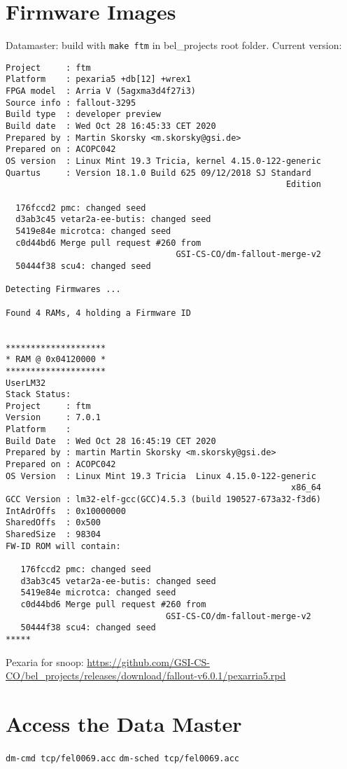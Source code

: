 \documentclass[12pt,a4paper]{report}
\begin{document}
\section{Firmware Images}
Datamaster: build with \texttt{make ftm} in bel\_projects root folder. Current version:
\begin{verbatim}
Project     : ftm
Platform    : pexaria5 +db[12] +wrex1
FPGA model  : Arria V (5agxma3d4f27i3)
Source info : fallout-3295
Build type  : developer preview
Build date  : Wed Oct 28 16:45:33 CET 2020
Prepared by : Martin Skorsky <m.skorsky@gsi.de>
Prepared on : ACOPC042
OS version  : Linux Mint 19.3 Tricia, kernel 4.15.0-122-generic
Quartus     : Version 18.1.0 Build 625 09/12/2018 SJ Standard
                                                        Edition

  176fccd2 pmc: changed seed
  d3ab3c45 vetar2a-ee-butis: changed seed
  5419e84e microtca: changed seed
  c0d44bd6 Merge pull request #260 from
                                  GSI-CS-CO/dm-fallout-merge-v2
  50444f38 scu4: changed seed

Detecting Firmwares ...

Found 4 RAMs, 4 holding a Firmware ID


********************
* RAM @ 0x04120000 *
********************
UserLM32
Stack Status:
Project     : ftm
Version     : 7.0.1
Platform    :
Build Date  : Wed Oct 28 16:45:19 CET 2020
Prepared by : martin Martin Skorsky <m.skorsky@gsi.de>
Prepared on : ACOPC042
OS Version  : Linux Mint 19.3 Tricia  Linux 4.15.0-122-generic
                                                         x86_64
GCC Version : lm32-elf-gcc(GCC)4.5.3 (build 190527-673a32-f3d6)
IntAdrOffs  : 0x10000000
SharedOffs  : 0x500
SharedSize  : 98304
FW-ID ROM will contain:

   176fccd2 pmc: changed seed
   d3ab3c45 vetar2a-ee-butis: changed seed
   5419e84e microtca: changed seed
   c0d44bd6 Merge pull request #260 from
                                GSI-CS-CO/dm-fallout-merge-v2
   50444f38 scu4: changed seed
*****
\end{verbatim}

Pexaria for snoop: \url{https://github.com/GSI-CS-CO/bel\_projects/releases/download/fallout-v6.0.1/pexarria5.rpd}

\section{Access the Data Master}
\texttt{dm-cmd tcp/fel0069.acc}
\linebreak
\texttt{dm-sched tcp/fel0069.acc}
\end{document}
